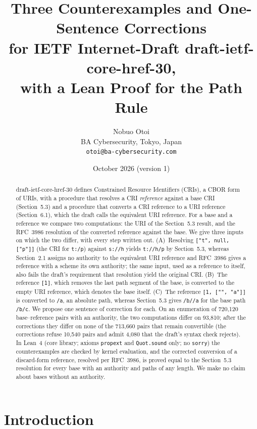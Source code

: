 \documentclass[11pt,a4paper]{article}
\title{Three Counterexamples and One-Sentence Corrections\\
for IETF Internet-Draft draft-ietf-core-href-30,\\
with a Lean Proof for the Path Rule}
\author{Nobuo Otoi\\BA Cybersecurity, Tokyo, Japan\\\texttt{otoi@ba-cybersecurity.com}}
\date{October 2026 (version 1)}
\theoremstyle{remark}
\newcommand{\lean}[1]{\texttt{#1}}
\newcommand{\cri}[1]{\texttt{#1}}
\newcommand{\uri}[1]{\texttt{#1}}
\begin{document}
\maketitle

\begin{abstract}
draft-ietf-core-href-30 defines Constrained Resource Identifiers (CRIs), a CBOR form of URIs, with a
procedure that resolves a CRI \emph{reference} against a base CRI (Section~5.3) and a procedure that
converts a CRI reference to a URI reference (Section~6.1), which the draft calls the equivalent URI
reference. For a base and a reference we compare two computations: the URI of the Section~5.3 result, and
the RFC~3986 resolution of the converted reference against the base. We give three inputs on which the two
differ, with every step written out. (A)~Resolving \cri{["t", null, ["p"]]} (the CRI for \uri{t:/p})
against \cri{s://h} yields \cri{t://h/p} by Section~5.3, whereas Section~2.1 assigns no authority to the
equivalent URI reference and RFC~3986 gives a reference with a scheme its own authority; the same input,
used as a reference to itself, also fails the draft's requirement that resolution yield the original CRI.
(B)~The reference \cri{[1]}, which removes the last path segment of the base, is converted to the empty
URI reference, which denotes the base itself. (C)~The reference \cri{[1, ["", "a"]]} is converted to
\uri{/a}, an absolute path, whereas Section~5.3 gives \uri{/b//a} for the base path \uri{/b/c}. We propose
one sentence of correction for each. On an enumeration of 720{,}120 base--reference pairs with an
authority, the two computations differ on 93{,}810; after the corrections they differ on none of the
713{,}660 pairs that remain convertible (the corrections refuse 10{,}540 pairs and admit 4{,}080 that
the draft's syntax check rejects). In Lean~4 (core library; axioms \lean{propext} and \lean{Quot.sound}
only; no \lean{sorry}) the counterexamples are checked by kernel evaluation, and the corrected conversion
of a discard-form reference, resolved per RFC~3986, is proved equal to the Section~5.3 resolution for
every base with an authority and paths of any length. We make no claim about bases without an authority.
\end{abstract}

\section{Introduction}
\label{sec:intro}
\end{document}
